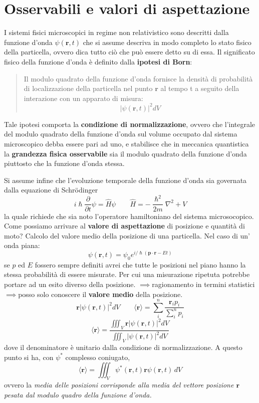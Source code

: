 
\section{Osservabili e valori di aspettazione}\label{sec:osservabili-e-valori-di-aspettazione}

I sistemi fisici microscopici in regime non relativistico sono descritti
dalla funzione d'onda \(\psi(\bm{r},t)\) che si assume descriva in modo
completo lo stato fisico della particella, ovvero dica tutto ciò che può
essere detto su di essa.
Il significato fisico della funzione d'onda è
definito dalla \textbf{ipotesi di Born}:
\begin{quote}
    Il modulo quadrato della funzione d'onda fornisce la densità di probabilità
    di localizzazione della particella nel punto \(\bm{r}\) al tempo t a seguito
    della interazione con un apparato di misura:
    \[
        | \psi(\bm{r},t)|^{2}dV
    \]
\end{quote}
Tale ipotesi comporta la \textbf{condizione di normalizzazione},
ovvero che l'integrale del modulo quadrato della funzione d'onda sul
volume occupato dal sistema microscopico debba essere pari ad uno, e
stabilisce che in meccanica quantistica la \textbf{grandezza fisica osservabile}
sia il modulo quadrato della funzione d'onda piuttosto che la funzione d'onda stessa.

Si assume infine che l'evoluzione temporale della funzione d'onda sia
governata dalla equazione di Schrödinger
\[
    i \hslash \frac{\partial}{\partial t} \psi = \hat{H} \psi \qquad \hat{H} = - \frac{\hslash^{2}}{2m} \nabla^{2} + V
\]
la quale richiede che sia noto l'operatore hamiltoniano del sistema microsocopico.
Come possiamo arrivare al \textbf{valore di aspettazione} di
posizione e quantità di moto?
Calcolo del valore medio della posizione
di una particella.
Nel caso di un' onda piana: \[
                                \psi(\bm{r},t) = \psi_{0} e^{ i/\hslash (\bm{p} \cdot \bm{r}-Et) }
\] se \(p\) ed \(E\) fossero sempre definiti avrei che tutte le
posizioni nel piano hanno la stessa probabilità di essere misurate.
Per
cui una misurazione ripetuta potrebbe portare ad un esito diverso della
posizione. \(\implies\)ragionamento in termini
statistici\(\implies\)posso solo conoscere il \textbf{valore medio}
della posizione. \[
                     \bm{r} |\psi(\bm{r},t)|^{2}dV \qquad \langle \bm{r} \rangle = \sum_{i}^{n} \frac{\bm{r}_{i}p_{i}}{\sum_{i}^{n}p_{i}}
\]
\begin{equation}
    \langle \bm{r} \rangle = \frac{\iiint_{V} \bm{r} |\psi(\bm{r},t)|^{2}dV }{\iiint_{V}|\psi(\bm{r},t)|^{2}dV }
    \label{eq:mean-value-quantum-position}
\end{equation} dove il denominatore è unitario dalla condizione di
normalizzazione.
A questo punto si ha, con \(\psi^*\) complesso
coniugato, \[
               \langle \bm{r} \rangle = \iiint_{V} \psi^*(\bm{r},t)\bm{r}\psi(\bm{r},t)\,dV
\] ovvero la \emph{media delle posizioni corrisponde alla media del
vettore posizione \(\bm{r}\) pesata dal modulo quadro della funzione
d'onda.}

